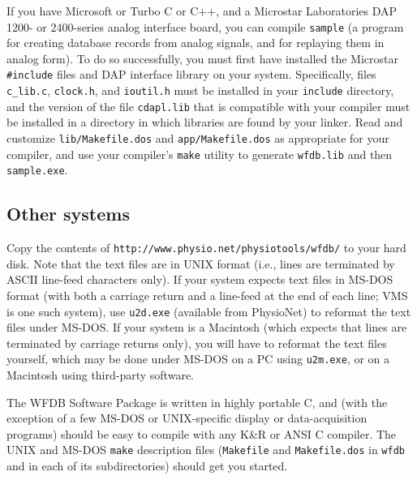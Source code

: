\documentclass[twoside]{article}
\begin{document}
If you have Microsoft or Turbo C or C++, and a Microstar Laboratories DAP 1200-
or 2400-series analog interface board, you can compile {\tt sample} (a program
for creating database records from analog signals, and for replaying them in
analog form).  To do so successfully, you must first have installed the
Microstar {\tt \#include} files and DAP interface library on your system.
Specifically, files {\tt c\_lib.c}, {\tt clock.h}, and {\tt ioutil.h} must be
installed in your {\tt include} directory, and the version of the file
{\tt cdapl.lib} that is compatible with your compiler must be installed in a
directory in which libraries are found by your linker.  Read and customize
{\tt lib/Makefile.dos} and {\tt app/Makefile.dos} as appropriate for your
compiler, and use your compiler's {\tt make} utility to generate {\tt wfdb.lib}
and then {\tt sample.exe}.

\subsection*{Other systems}

Copy the contents of {\tt http://www.\-physio.\-net/physio\-tools/wfdb/} to
your hard disk.  Note that the text files are in UNIX format (i.e., lines are
terminated by ASCII line-feed characters only).  If your system expects text
files in MS-DOS format (with both a carriage return and a line-feed at the end
of each line; VMS is one such system), use {\tt u2d.exe} (available from
PhysioNet) to reformat the text files under MS-DOS.  If your system is a
Macintosh (which expects that lines are terminated by carriage returns only),
you will have to reformat the text files yourself, which may be done under
MS-DOS on a PC using {\tt u2m.exe}, or on a Macintosh using third-party
software.

The WFDB Software Package is written in highly portable C, and (with the
exception of a few MS-DOS or UNIX-specific display or data-acquisition
programs) should be easy to compile with any K\&R or ANSI C compiler.
The UNIX and MS-DOS {\tt make} description files ({\tt Makefile}
and {\tt Makefile.dos} in {\tt wfdb} and in each of its subdirectories)
should get you started.
\end{document}
